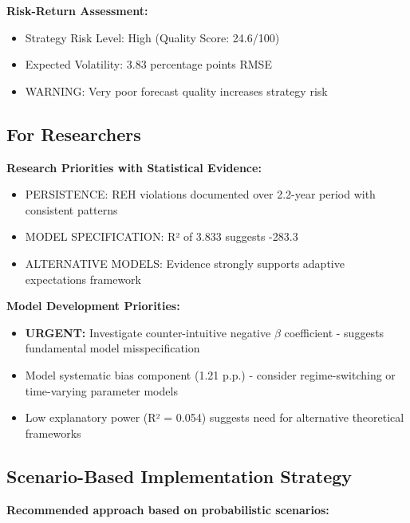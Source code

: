 \documentclass[11pt,a4paper]{article}
\begin{document}
\textbf{Risk-Return Assessment:}
\begin{itemize}
\item Strategy Risk Level: High (Quality Score: 24.6/100)
\item Expected Volatility: 3.83 percentage points RMSE
\item \textcolor{academicred}{WARNING: Very poor forecast quality increases strategy risk}
\end{itemize}

\subsection{For Researchers}
\textbf{Research Priorities with Statistical Evidence:}

\begin{itemize}
  \item PERSISTENCE: REH violations documented over 2.2-year period with consistent patterns
  \item MODEL SPECIFICATION: R² of 3.833 suggests -283.3%
  \item ALTERNATIVE MODELS: Evidence strongly supports adaptive expectations framework
\end{itemize}

\textbf{Model Development Priorities:}
\begin{itemize}
  \item \textbf{URGENT:} Investigate counter-intuitive negative $\beta$ coefficient - suggests fundamental model misspecification
  \item Model systematic bias component (1.21 p.p.) - consider regime-switching or time-varying parameter models
  \item Low explanatory power (R² = 0.054) suggests need for alternative theoretical frameworks
\end{itemize}

\subsection{Scenario-Based Implementation Strategy}
\textbf{Recommended approach based on probabilistic scenarios:}
\end{document}
